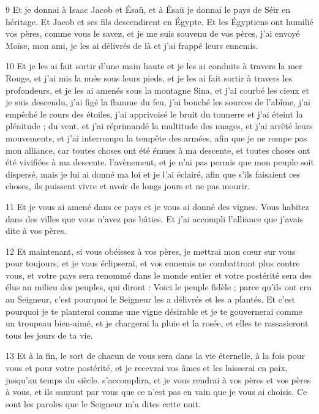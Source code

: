 \par 9 Et je donnai à Isaac Jacob et Ésaü, et à Ésaü je donnai le pays de Séir en héritage. Et Jacob et ses fils descendirent en Égypte. Et les Égyptiens ont humilié vos pères, comme vous le savez, et je me suis souvenu de vos pères, j'ai envoyé Moïse, mon ami, je les ai délivrés de là et j'ai frappé leurs ennemis.

\par 10 Et je les ai fait sortir d'une main haute et je les ai conduits à travers la mer Rouge, et j'ai mis la nuée sous leurs pieds, et je les ai fait sortir à travers les profondeurs, et je les ai amenés sous la montagne Sina, et j'ai courbé les cieux et je suis descendu, j'ai figé la flamme du feu, j'ai bouché les sources de l'abîme, j'ai empêché le cours des étoiles, j'ai apprivoisé le bruit du tonnerre et j'ai éteint la plénitude ; du vent, et j'ai réprimandé la multitude des nuages, et j'ai arrêté leurs mouvements, et j'ai interrompu la tempête des armées, afin que je ne rompe pas mon alliance, car toutes choses ont été émues à ma descente, et toutes choses ont été vivifiées à ma descente. l'avènement, et je n'ai pas permis que mon peuple soit dispersé, mais je lui ai donné ma loi et je l'ai éclairé, afin que s'ils faisaient ces choses, ils puissent vivre et avoir de longs jours et ne pas mourir.

\par 11 Et je vous ai amené dans ce pays et je vous ai donné des vignes. Vous habitez dans des villes que vous n'avez pas bâties. Et j'ai accompli l'alliance que j'avais dite à vos pères.

\par 12 Et maintenant, si vous obéissez à vos pères, je mettrai mon cœur sur vous pour toujours, et je vous éclipserai, et vos ennemis ne combattront plus contre vous, et votre pays sera renommé dans le monde entier et votre postérité sera des élus au milieu des peuples, qui diront : Voici le peuple fidèle ; parce qu'ils ont cru au Seigneur, c'est pourquoi le Seigneur les a délivrés et les a plantés. Et c'est pourquoi je te planterai comme une vigne désirable et je te gouvernerai comme un troupeau bien-aimé, et je chargerai la pluie et la rosée, et elles te rassasieront tous les jours de ta vie.

\par 13 Et à la fin, le sort de chacun de vous sera dans la vie éternelle, à la fois pour vous et pour votre postérité, et je recevrai vos âmes et les laisserai en paix, jusqu'au temps du siècle. s'accomplira, et je vous rendrai à vos pères et vos pères à vous, et ils sauront par vous que ce n'est pas en vain que je vous ai choisis. Ce sont les paroles que le Seigneur m’a dites cette nuit.

